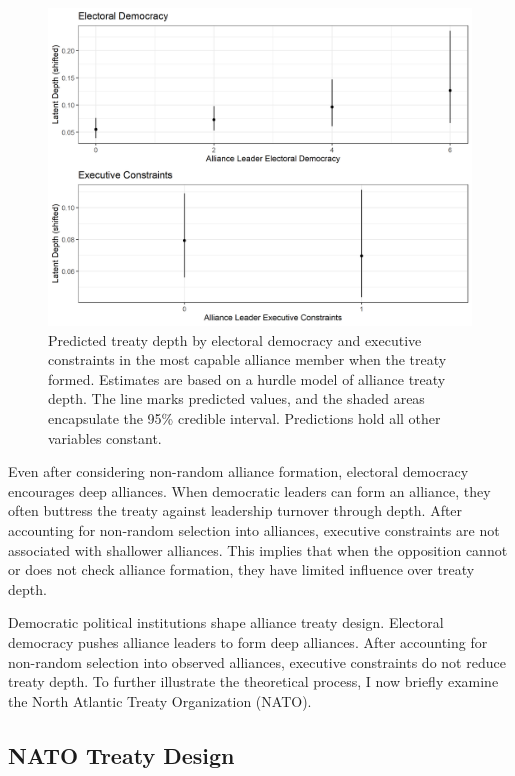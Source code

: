 \documentclass[12pt]{article}
\begin{document}
\begin{figure}
\includegraphics[width=.95\textwidth]{../figures/results-hurdle.png}  
\caption{Predicted treaty depth by electoral democracy and executive constraints in the most capable alliance member when the treaty formed. Estimates are based on a hurdle model of alliance treaty depth. The line marks predicted values, and the shaded areas encapsulate the 95\% credible interval. Predictions hold all other variables constant.}
\label{fig:results-hurdle}
\end{figure}


Even after considering non-random alliance formation, electoral democracy encourages deep alliances. 
When democratic leaders can form an alliance, they often buttress the treaty against leadership turnover through depth. 
After accounting for non-random selection into alliances, executive constraints are not associated with shallower alliances.
This implies that when the opposition cannot or does not check alliance formation, they have limited influence over treaty depth. 


Democratic political institutions shape alliance treaty design. 
Electoral democracy pushes alliance leaders to form deep alliances. 
After accounting for non-random selection into observed alliances, executive constraints do not reduce treaty depth. 
To further illustrate the theoretical process, I now briefly examine the North Atlantic Treaty Organization (NATO).



\subsection{NATO Treaty Design}
\end{document}
